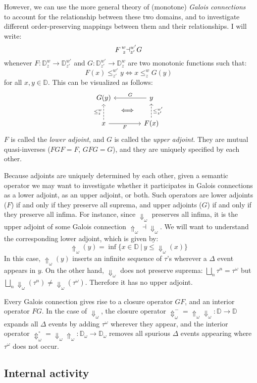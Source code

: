 \documentclass[11pt]{article}
\begin{document}
However,
we can use the more general theory of (monotone) \emph{Galois connections}
to account for the relationship between these two domains,
and to investigate different order-preserving mappings between them
and their relationships.
I will write:
\[
    F \prescript{w}{z}\dashv^{w'}_{z'} G
\]
whenever
$F : {\mathbb{D}^w_z} \rightarrow {\mathbb{D}^{w'}_{z'}}$ and
$G : {\mathbb{D}^{w'}_{z'}} \rightarrow {\mathbb{D}^w_z}$
are two monotonic functions such that:
\[
    F(x) \le^{w'}_{z'} y \Leftrightarrow x \le^w_z G(y)
\]
for all $x, y \in \mathbb{D}$.
This can be visualized as follows:
\[
  \begin{tikzcd}[row sep=tiny, column sep=tiny]
    G(y) &  & y \arrow[ll, "G"'] \\
    & \Longleftrightarrow & \\
    x \arrow[uu, dashed, "\le^w_z"] \arrow[rr, "F"'] & &
    F(x) \arrow[uu, dashed, "\le^{w'}_{z'}"']
  \end{tikzcd}
\]
$F$ is called the \emph{lower adjoint}, and
$G$ is called the \emph{upper adjoint}.
They are mutual quasi-inverses ($FGF = F$, $GFG = G$),
and they are uniquely specified by each other.

Because adjoints are uniquely determined by each other,
given a semantic operator
we may want to investigate whether it participates
in Galois connections as a lower adjoint, as an upper adjoint, or both.
Such operators are
lower adjoints ($F$) if and only if they preserve all suprema, and
upper adjoints ($G$) if and only if they preserve all infima.
For instance, since $\Downarrow_\omega$ preserves all infima,
it is the upper adjoint of some Galois connection
${\Uparrow}_\omega \dashv {\Downarrow}_\omega$.
We will want to understand the corresponding lower adjoint,
which is given by:
\[
    {\Uparrow_\omega}(y) =
      \inf \{ x \in \mathbb{D} \:|\: y \le {\Downarrow_\omega}(x) \}
\]
In this case,
${\Uparrow}_\omega(y)$ inserts an infinite sequence of $\tau$'s
wherever a $\Delta$ event appears in $y$.
On the other hand,
$\Downarrow_\omega$ does not preserve suprema:
$\bigsqcup_n \tau^n = \tau^\omega$ but
$\bigsqcup_n {\Downarrow}_\omega(\tau^n) \neq {\Downarrow}_\omega(\tau^\omega)$.
Therefore it has no upper adjoint.

Every Galois connection gives rise to a closure operator $GF$,
and an interior operator $FG$.
In the case of $\Downarrow_\omega$,
the closure operator
${\Updownarrow}_\omega^- =
 {\Uparrow}_\omega {\Downarrow_\omega} :
 \mathbb{D} \rightarrow \mathbb{D}$
expands all $\Delta$ events by adding
$\tau^\omega$ wherever they appear,
and the interior operator
${\Updownarrow}_\omega^\circ =
 {\Downarrow}_\omega {\Uparrow}_\omega :
 \mathbb{D}_\omega \rightarrow \mathbb{D}_\omega$
removes all spurious $\Delta$ events
appearing where $\tau^\omega$ does not occur.


\subsection{Internal activity} %





\end{document}
